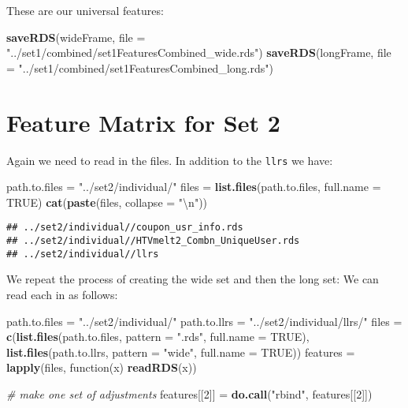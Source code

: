 \documentclass[10pt]{report}
\newenvironment{Shaded}{}{}
\newcommand{\KeywordTok}[1]{\textcolor[rgb]{0.00,0.44,0.13}{\textbf{{#1}}}}
\newcommand{\DataTypeTok}[1]{\textcolor[rgb]{0.56,0.13,0.00}{{#1}}}
\newcommand{\DecValTok}[1]{\textcolor[rgb]{0.25,0.63,0.44}{{#1}}}
\newcommand{\CharTok}[1]{\textcolor[rgb]{0.25,0.44,0.63}{{#1}}}
\newcommand{\StringTok}[1]{\textcolor[rgb]{0.25,0.44,0.63}{{#1}}}
\newcommand{\CommentTok}[1]{\textcolor[rgb]{0.38,0.63,0.69}{\textit{{#1}}}}
\newcommand{\OtherTok}[1]{\textcolor[rgb]{0.00,0.44,0.13}{{#1}}}
\newcommand{\NormalTok}[1]{{#1}}
\begin{document}
These are our universal features:

\begin{Shaded}
\begin{Highlighting}[]
\KeywordTok{saveRDS}\NormalTok{(wideFrame, }\DataTypeTok{file =} \StringTok{"../set1/combined/set1FeaturesCombined_wide.rds"}\NormalTok{)}
\KeywordTok{saveRDS}\NormalTok{(longFrame, }\DataTypeTok{file =} \StringTok{"../set1/combined/set1FeaturesCombined_long.rds"}\NormalTok{)}
\end{Highlighting}
\end{Shaded}

\section{Feature Matrix for Set 2}\label{feature-matrix-for-set-2}

Again we need to read in the files. In addition to the \verb!llrs! we
have:

\begin{Shaded}
\begin{Highlighting}[]
\NormalTok{path.to.files =}\StringTok{ "../set2/individual/"}
\NormalTok{files =}\StringTok{ }\KeywordTok{list.files}\NormalTok{(path.to.files, }\DataTypeTok{full.name =} \OtherTok{TRUE}\NormalTok{)}
\KeywordTok{cat}\NormalTok{(}\KeywordTok{paste}\NormalTok{(files, }\DataTypeTok{collapse =} \StringTok{"}\CharTok{\textbackslash{}n}\StringTok{"}\NormalTok{))}
\end{Highlighting}
\end{Shaded}

\begin{verbatim}
## ../set2/individual//coupon_usr_info.rds
## ../set2/individual//HTVmelt2_Combn_UniqueUser.rds
## ../set2/individual//llrs
\end{verbatim}

We repeat the process of creating the wide set and then the long set: We
can read each in as follows:

\begin{Shaded}
\begin{Highlighting}[]
\NormalTok{path.to.files =}\StringTok{ "../set2/individual/"}
\NormalTok{path.to.llrs =}\StringTok{ "../set2/individual/llrs/"}
\NormalTok{files =}\StringTok{ }\KeywordTok{c}\NormalTok{(}\KeywordTok{list.files}\NormalTok{(path.to.files, }\DataTypeTok{pattern =} \StringTok{".rds"}\NormalTok{, }\DataTypeTok{full.name =} \OtherTok{TRUE}\NormalTok{), }\KeywordTok{list.files}\NormalTok{(path.to.llrs, }
    \DataTypeTok{pattern =} \StringTok{"wide"}\NormalTok{, }\DataTypeTok{full.name =} \OtherTok{TRUE}\NormalTok{))}
\NormalTok{features =}\StringTok{ }\KeywordTok{lapply}\NormalTok{(files, function(x) }\KeywordTok{readRDS}\NormalTok{(x))}

\CommentTok{# make one set of adjustments}
\NormalTok{features[[}\DecValTok{2}\NormalTok{]] =}\StringTok{ }\KeywordTok{do.call}\NormalTok{(}\StringTok{"rbind"}\NormalTok{, features[[}\DecValTok{2}\NormalTok{]])}
\end{Highlighting}
\end{Shaded}
\end{document}
